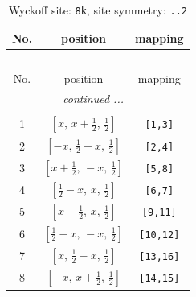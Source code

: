\documentclass[fleqn,8pt]{jsarticle}
\begin{document}
\begin{longtable}{ccc}
\caption{Wyckoff site: {\tt 8k}, site symmetry: {\tt ..2}}
 \\
 \hline \hline
No. & position & mapping \\ \hline \endfirsthead

\multicolumn{2}{l}{\tablename\ \thetable{}} \\
 \hline \hline
No. & position & mapping \\ \hline \endhead

 \hline \hline
\multicolumn{2}{r}{\footnotesize\it continued ...} \\ \endfoot

 \hline \hline
\multicolumn{2}{r}{} \\ \endlastfoot

1 & $\left[ x,\, x + \frac{1}{2},\, \frac{1}{2} \right]$ & {\tt [1,3]} \\ \hline
2 & $\left[ - x,\, \frac{1}{2} - x,\, \frac{1}{2} \right]$ & {\tt [2,4]} \\ \hline
3 & $\left[ x + \frac{1}{2},\, - x,\, \frac{1}{2} \right]$ & {\tt [5,8]} \\ \hline
4 & $\left[ \frac{1}{2} - x,\, x,\, \frac{1}{2} \right]$ & {\tt [6,7]} \\ \hline
5 & $\left[ x + \frac{1}{2},\, x,\, \frac{1}{2} \right]$ & {\tt [9,11]} \\ \hline
6 & $\left[ \frac{1}{2} - x,\, - x,\, \frac{1}{2} \right]$ & {\tt [10,12]} \\ \hline
7 & $\left[ x,\, \frac{1}{2} - x,\, \frac{1}{2} \right]$ & {\tt [13,16]} \\ \hline
8 & $\left[ - x,\, x + \frac{1}{2},\, \frac{1}{2} \right]$ & {\tt [14,15]} \\
\end{longtable}
\renewcommand{\arraystretch}{1.2}
\end{document}

